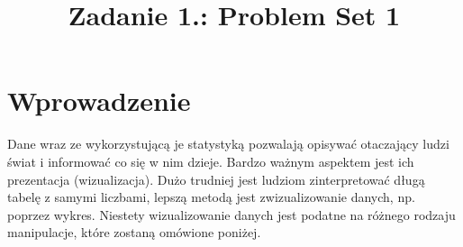 \documentclass{classrep}
\author{%
    \studentinfo[239661@edu.p.lodz.pl]{Szymon Gruda}{239661}
}
\title{Zadanie 1.: Problem Set 1}
\begin{document}
    \maketitle
    \thispagestyle{fancyplain}

    \section{Wprowadzenie} {
        Dane wraz ze wykorzystującą je statystyką pozwalają opisywać otaczający ludzi świat i informować co się w nim dzieje.
         Bardzo ważnym aspektem jest ich prezentacja (wizualizacja). Dużo trudniej jest ludziom zinterpretować długą tabelę 
         z samymi liczbami, lepszą metodą jest zwizualizowanie danych, np. poprzez wykres. Niestety wizualizowanie danych jest 
         podatne na różnego rodzaju manipulacje, które zostaną omówione poniżej.
    }
\end{document}
